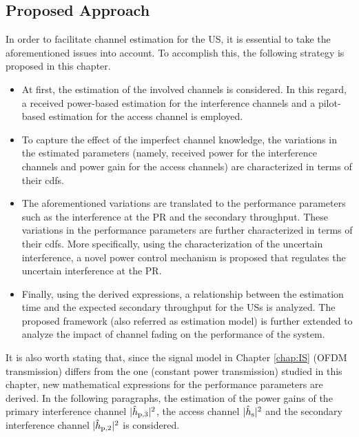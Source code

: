 \subsection{Proposed Approach} 
In order to facilitate channel estimation for the US, it is essential to take the aforementioned issues into account. To accomplish this, the following strategy is proposed in this chapter.
\begin{itemize}
\item At first, the estimation of the involved channels is considered. In this regard, a received power-based estimation for the interference channels and a pilot-based estimation for the access channel is employed. 
\item To capture the effect of the imperfect channel knowledge, the variations in the estimated parameters (namely, received power for the interference channels and power gain for the access channels) are characterized in terms of their cdfs.
\item The aforementioned variations are translated to the performance parameters such as the interference at the PR and the secondary throughput. These variations in the performance parameters are further characterized in terms of their cdfs. More specifically, using the characterization of the uncertain interference, a novel power control mechanism is proposed that regulates the uncertain interference at the PR.  
\item Finally, using the derived expressions, a relationship between the estimation time and the expected secondary throughput for the USs is analyzed. The proposed framework (also referred as estimation model) is further extended to analyze the impact of channel fading on the performance of the system. 
\end{itemize}
It is also worth stating that, since the signal model in Chapter \ref{chap:IS} (OFDM transmission) differs from the one (constant power transmission) studied in this chapter, new mathematical expressions for the performance parameters are derived. In the following paragraphs, the estimation of the power gains of the primary interference channel $|\hat{h}_{\text{p,3}}|^2$, the access channel $|\hat{h}_{\text{s}}|^2$ and the secondary interference channel $|\hat{h}_{\text{p,2}}|^2$ is considered. 

